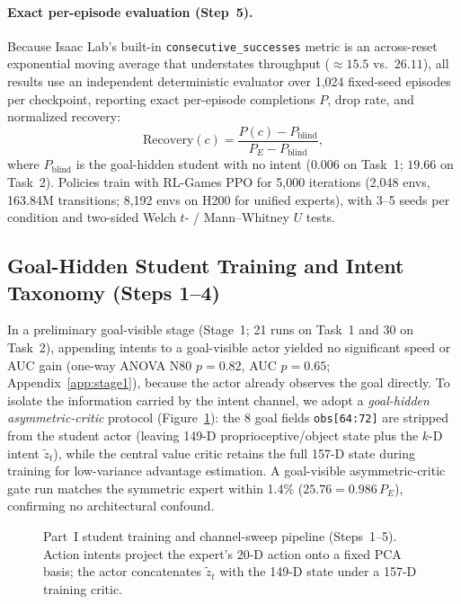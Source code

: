\paragraph{Exact per-episode evaluation (Step~5).}
Because Isaac Lab's built-in \texttt{consecutive\_successes} metric is an across-reset exponential moving average that understates throughput ($\approx 15.5$ vs.\ $26.11$), all results use an independent deterministic evaluator over 1,024 fixed-seed episodes per checkpoint, reporting exact per-episode completions $P$, drop rate, and normalized recovery:
\begin{equation}
  \mathrm{Recovery}(c) = \frac{P(c) - P_{\mathrm{blind}}}{P_E - P_{\mathrm{blind}}},
  \label{eq:recovery}
\end{equation}
where $P_{\mathrm{blind}}$ is the goal-hidden student with no intent ($0.006$ on Task~1; $19.66$ on Task~2).
Policies train with RL-Games PPO \citep{schulman2017proximal,makoviichuk2021rlgames} for 5,000 iterations (2,048 envs, 163.84M transitions; 8,192 envs on H200 for unified experts), with 3--5 seeds per condition and two-sided Welch $t$- / Mann--Whitney $U$ tests.

\subsection{Goal-Hidden Student Training and Intent Taxonomy (Steps 1--4)}
\label{sec:method_student}
In a preliminary goal-visible stage (Stage~1; 21 runs on Task~1 and 30 on Task~2), appending intents to a goal-visible actor yielded no significant speed or AUC gain (one-way ANOVA N80 $p=0.82$, AUC $p=0.65$; Appendix~\ref{app:stage1}), because the actor already observes the goal directly.
To isolate the information carried by the intent channel, we adopt a \emph{goal-hidden asymmetric-critic} protocol (Figure~\ref{fig:protocol}): the 8 goal fields \texttt{obs[64:72]} are stripped from the student actor (leaving 149-D proprioceptive/object state plus the $k$-D intent $\tilde{z}_t$), while the central value critic \citep{pinto2018asymmetric} retains the full 157-D state during training for low-variance advantage estimation.
A goal-visible asymmetric-critic gate run matches the symmetric expert within 1.4\% ($25.76 = 0.986\,P_E$), confirming no architectural confound.

\begin{figure}[t]
  \centering
  
  \caption{Part~I student training and channel-sweep pipeline (Steps~1--5). Action intents project the expert's 20-D action onto a fixed PCA basis; the actor concatenates $\tilde{z}_t$ with the 149-D state under a 157-D training critic.}
  \label{fig:protocol}
\end{figure}

